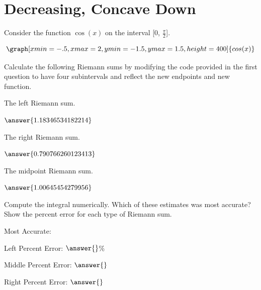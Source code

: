\documentclass{ximera}
\begin{document}
\section{Decreasing, Concave Down}
\begin{question}
Consider the function $\cos(x)$ on the interval [0, $\frac{\pi}{2}$].

\[
\graph[xmin=-.5,xmax=2,ymin=-1.5,ymax=1.5,height=400]{cos(x)}
\]

Calculate the following Riemann sums by modifying the code provided in the first question to have four subintervals and reflect the new endpoints and new function.

The left Riemann sum.

\begin{onlineOnly}
\begin{sageCell}

\end{sageCell}
\end{onlineOnly}

$\answer{1.18346534182214}$

The right Riemann sum.

\begin{onlineOnly}
\begin{sageCell}

\end{sageCell}
\end{onlineOnly}

$\answer{0.790766260123413}$

The midpoint Riemann sum.

\begin{onlineOnly}
\begin{sageCell}

\end{sageCell}
\end{onlineOnly}

$\answer{1.00645454279956}$

Compute the integral numerically. Which of these estimates was most accurate? Show the percent error for each type of Riemann sum.

\begin{onlineOnly}
\begin{sageCell}

\end{sageCell}
\end{onlineOnly}

Most Accurate:
\begin{multipleChoice}
\end{multipleChoice}
Left Percent Error: $\answer{}$\%

Middle Percent Error: $\answer{}$

Right Percent Error: $\answer{}$
\end{question}
\end{document}
